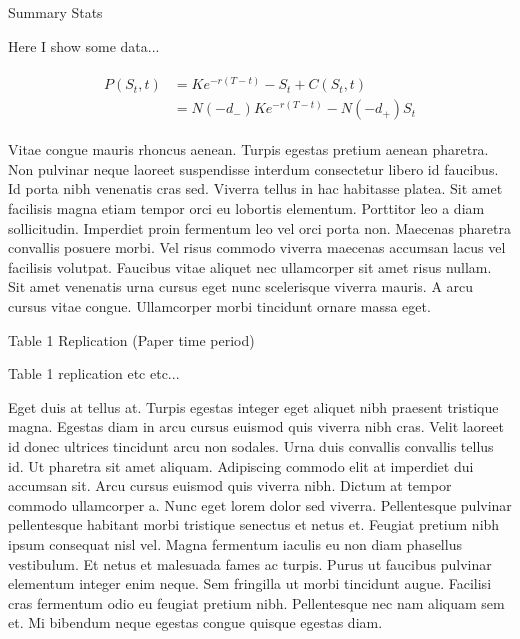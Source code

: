 \documentclass[12pt]{article}
\begin{document}
\begin{table}
    \caption{Summary Stats}
    \centering
    \renewcommand{\arraystretch}{1.2}  %
    \setlength{\tabcolsep}{5pt}        %
    \begin{adjustbox}{max width=\textwidth}
    
    \end{adjustbox}
    \caption*{
      Here I show some data...
    }
    \label{table:sector_settlement_summary}
\end{table}

\begin{align}
\begin{split}
P(S_t, t) &= Ke^{-r(T - t)} - S_t + C(S_t, t)   \\
          &= N(-d_-) Ke^{-r(T - t)} - N(-d_+) S_t 
\end{split}
\label{eq:align-share}
\end{align}



Vitae congue mauris rhoncus aenean. Turpis egestas pretium aenean pharetra.
Non pulvinar neque laoreet suspendisse interdum consectetur libero id
faucibus. Id porta nibh venenatis cras sed. Viverra tellus in hac habitasse
platea. Sit amet facilisis magna etiam tempor orci eu lobortis elementum.
Porttitor leo a diam sollicitudin. Imperdiet proin fermentum leo vel orci
porta non. Maecenas pharetra convallis posuere morbi. Vel risus commodo
viverra maecenas accumsan lacus vel facilisis volutpat. Faucibus vitae
aliquet nec ullamcorper sit amet risus nullam. Sit amet venenatis urna cursus
eget nunc scelerisque viverra mauris. A arcu cursus vitae congue. Ullamcorper
morbi tincidunt ornare massa eget.

\begin{table}
    \caption{Table 1 Replication (Paper time period)}
    \centering
    \begin{adjustbox}{max width=\textwidth}
    
    \end{adjustbox}
    \caption*{
      Table 1 replication etc etc...
    }
    \label{table:paper_table1_replication}
\end{table}

Eget duis at tellus at. Turpis egestas integer eget aliquet nibh praesent
tristique magna. Egestas diam in arcu cursus euismod quis viverra nibh cras.
Velit laoreet id donec ultrices tincidunt arcu non sodales. Urna duis
convallis convallis tellus id. Ut pharetra sit amet aliquam. Adipiscing
commodo elit at imperdiet dui accumsan sit. Arcu cursus euismod quis viverra
nibh. Dictum at tempor commodo ullamcorper a. Nunc eget lorem dolor sed
viverra. Pellentesque pulvinar pellentesque habitant morbi tristique senectus
et netus et. Feugiat pretium nibh ipsum consequat nisl vel. Magna fermentum
iaculis eu non diam phasellus vestibulum. Et netus et malesuada fames ac
turpis. Purus ut faucibus pulvinar elementum integer enim neque. Sem
fringilla ut morbi tincidunt augue. Facilisi cras fermentum odio eu feugiat
pretium nibh. Pellentesque nec nam aliquam sem et. Mi bibendum neque egestas
congue quisque egestas diam.
\end{document}
